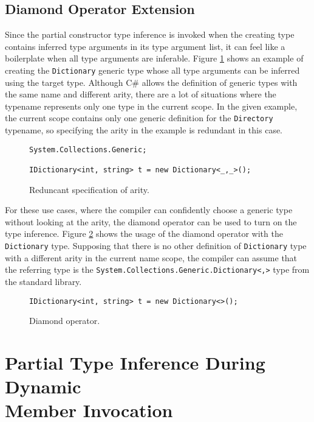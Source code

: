 \subsection{Diamond Operator Extension} \label{sect13:ex2}

Since the partial constructor type inference is invoked when the creating type contains inferred type arguments in its type argument list, it can feel like a boilerplate when all type arguments are inferable. 
Figure \ref{img57:diamondExample} shows an example of creating the \texttt{Dictionary} generic type whose all type arguments can be inferred using the target type. 
Although C\# allows the definition of generic types with the same name and different arity, there are a lot of situations where the typename represents only one type in the current scope.
In the given example, the current scope contains only one generic definition for the \texttt{Directory} typename, so specifying the arity in the example is redundant in this case.
\begin{figure}[h!]
\begin{lstlisting}[style=csharp, mathescape=true]
System.Collections.Generic;

IDictionary<int, string> t = new Dictionary<_,_>();
\end{lstlisting}
\caption{Reduncant specification of arity.}
\label{img57:diamondExample}
\end{figure}
\par
For these use cases, where the compiler can confidently choose a generic type without looking at the arity, the diamond operator can be used to turn on the type inference. 
Figure \ref{img58:diamondExample2} shows the usage of the diamond operator with the \texttt{Dictionary} type. 
Supposing that there is no other definition of \texttt{Dictionary} type with a different arity in the current name scope, the compiler can assume that the referring type is the \texttt{System.Collections.Generic.Dictionary<,>} type from the standard library.
\begin{figure}[h!]
\begin{lstlisting}[style=csharp, mathescape=true]
IDictionary<int, string> t = new Dictionary<>();
\end{lstlisting}
\caption{Diamond operator.}
\label{img58:diamondExample2}
\end{figure}

\section{Partial Type Inference During Dynamic\\ Member Invocation} \label{sect11:dynamic}

